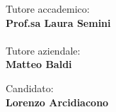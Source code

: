 \begin{titlepage}
\begin{minipage}[t]{0.47\textwidth}
	{\large{Tutore accademico:}{\normalsize\vspace{3mm}
	\bf\\ \large{Prof.sa Laura Semini}}}\\
    {\\\large{Tutore aziendale:}{\normalsize\vspace{3mm}
	\bf\\ \large{Matteo Baldi}}}
\end{minipage}
\hfill
\begin{minipage}[t]{0.47\textwidth}\raggedleft
	{\large{Candidato:}{\normalsize\vspace{3mm} \bf\\ \large{Lorenzo Arcidiacono}}}
\end{minipage}

\vspace{10mm}
\hrulefill
\\

\end{titlepage}